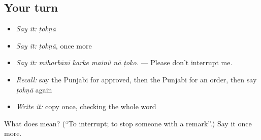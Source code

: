 \subsection*{Your turn}
\begin{itemize}
\raggedright
  \item \emph{Say it:} \emph{ṭokṇā}
  \item \emph{Say it:} \emph{ṭokṇā}, once more
  \item \emph{Say it:} \emph{miharbānī karke mainū̃ nā ṭoko.} — Please don't interrupt me.
  \item \emph{Recall:} say the Punjabi for approved, then the Punjabi for an order, then say \emph{ṭokṇā} again
  \item \emph{Write it:} copy \textbf{} once, checking the whole word
\end{itemize}

\begin{tcolorbox}[breakable,colback=teal!4,colframe=teal!35!black,title={Before you move on}]
What does  mean? (\textquotedblleft{}To interrupt; to stop someone with a remark\textquotedblright{}.) Say it once more.
\end{tcolorbox}
